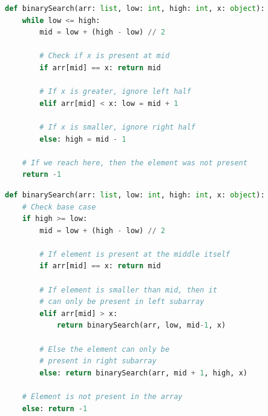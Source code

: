 \begin{lstlisting}[language=Python, caption=Binary Search (iterative) - Python]
def binarySearch(arr: list, low: int, high: int, x: object):
    while low <= high:
        mid = low + (high - low) // 2

        # Check if x is present at mid
        if arr[mid] == x: return mid

        # If x is greater, ignore left half
        elif arr[mid] < x: low = mid + 1

        # If x is smaller, ignore right half
        else: high = mid - 1

    # If we reach here, then the element was not present
    return -1
\end{lstlisting}

\begin{lstlisting}[language=Python, caption=Binary Search (recursive) - Python]
def binarySearch(arr: list, low: int, high: int, x: object):
    # Check base case
    if high >= low:
        mid = low + (high - low) // 2
        
        # If element is present at the middle itself
        if arr[mid] == x: return mid
            
        # If element is smaller than mid, then it
        # can only be present in left subarray
        elif arr[mid] > x: 
            return binarySearch(arr, low, mid-1, x)

        # Else the element can only be 
        # present in right subarray
        else: return binarySearch(arr, mid + 1, high, x)

    # Element is not present in the array
    else: return -1
\end{lstlisting}








































